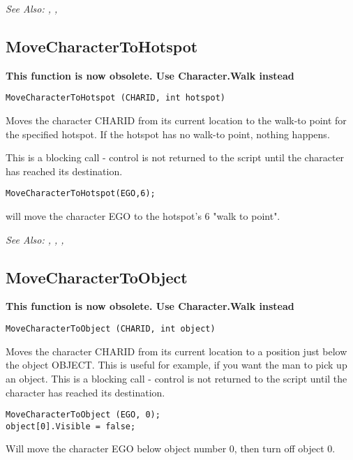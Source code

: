 \it{See Also:} ,
,


\subsection{MoveCharacterToHotspot}\label{MoveCharacterToHotspot}%

\bf{This function is now obsolete. Use Character.Walk instead}

\begin{verbatim}
MoveCharacterToHotspot (CHARID, int hotspot)
\end{verbatim}
Moves the character CHARID from its current location to the walk-to point
for the specified hotspot. If the hotspot has no walk-to point, nothing
happens.

This is a blocking call - control is not returned to the script until the
character has reached its destination.

\begin{verbatim}
MoveCharacterToHotspot(EGO,6);
\end{verbatim}
will move the character EGO to the hotspot's 6 "walk to point".

\it{See Also:} , ,
, 


\subsection{MoveCharacterToObject}\label{MoveCharacterToObject}%

\bf{This function is now obsolete. Use Character.Walk instead}

\begin{verbatim}
MoveCharacterToObject (CHARID, int object)
\end{verbatim}
Moves the character CHARID from its current location to a position just below
the object OBJECT. This is useful for example, if you want the man to pick
up an object.
This is a blocking call - control is not returned to the script until the
character has reached its destination.

\begin{verbatim}
MoveCharacterToObject (EGO, 0);
object[0].Visible = false;
\end{verbatim}
Will move the character EGO below object number 0, then turn off object 0.

